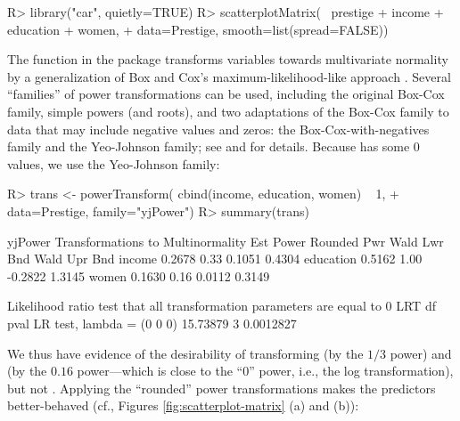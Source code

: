 \documentclass[
]{jss}
\begin{document}
\begin{CodeChunk}
\begin{CodeInput}
R> library("car", quietly=TRUE)
R> scatterplotMatrix(~ prestige + income + education + women,
+                   data=Prestige, smooth=list(spread=FALSE))
\end{CodeInput}
\end{CodeChunk}

The  function in the  package transforms
variables towards multivariate normality by a generalization of Box and
Cox's maximum-likelihood-like approach \citep{BoxCox:1964}. Several
``families'' of power transformations can be used, including the
original Box-Cox family, simple powers (and roots), and two adaptations
of the Box-Cox family to data that may include negative values and
zeros: the Box-Cox-with-negatives family and the Yeo-Johnson family; see
\citet[Chap. 8]{Weisberg:2014} and \citet[Chap. 3]{FoxWeisberg:2019} for
details. Because  has some 0 values, we use the Yeo-Johnson
family:

\begin{CodeChunk}
\begin{CodeInput}
R> trans <- powerTransform( cbind(income, education, women) ~ 1,
+                          data=Prestige, family="yjPower")
R> summary(trans)
\end{CodeInput}
\begin{CodeOutput}
yjPower Transformations to Multinormality 
          Est Power Rounded Pwr Wald Lwr Bnd Wald Upr Bnd
income       0.2678        0.33       0.1051       0.4304
education    0.5162        1.00      -0.2822       1.3145
women        0.1630        0.16       0.0112       0.3149

 Likelihood ratio test that all transformation parameters are equal to 0
                               LRT df      pval
LR test, lambda = (0 0 0) 15.73879  3 0.0012827
\end{CodeOutput}
\end{CodeChunk}

We thus have evidence of the desirability of transforming 
(by the \(1/3\) power) and  (by the \(0.16\) power---which
is close to the ``0'' power, i.e., the log transformation), but not
. Applying the ``rounded'' power transformations makes
the predictors better-behaved (cf., Figures \ref{fig:scatterplot-matrix}
(a) and (b)):

\begin{CodeChunk}
\end{CodeChunk}
\end{document}
